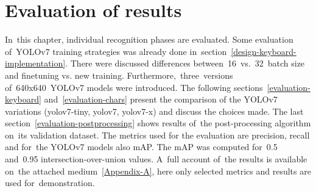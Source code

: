 \chapter{Evaluation of results}
\label{evaluation}
In~this chapter, individual recognition phases are evaluated. Some evaluation of~YOLOv7 training strategies was already done in~section~\ref{design-keyboard-implementation}. There were discussed differences between~16~vs.~32~batch size and finetuning vs. new training. Furthermore,~three~versions of~640x640~YOLOv7 models were introduced. The following sections~\ref{evaluation-keyboard} and~\ref{evaluation-chars} present the comparison of the YOLOv7 variations (yolov7-tiny, yolov7, yolov7-x) and discuss the choices made. The last section~\ref{evaluation-postprocessing} shows results of~the post-processing algorithm on~its validation dataset. The metrics used for the evaluation are precision, recall and for~the YOLOv7 models also mAP. The mAP was computed for~0.5 and~0.95 intersection-over-union values. A~full account of~the results is available on~the attached medium~\ref{Appendix-A}, here only selected metrics and results are used for~demonstration.

